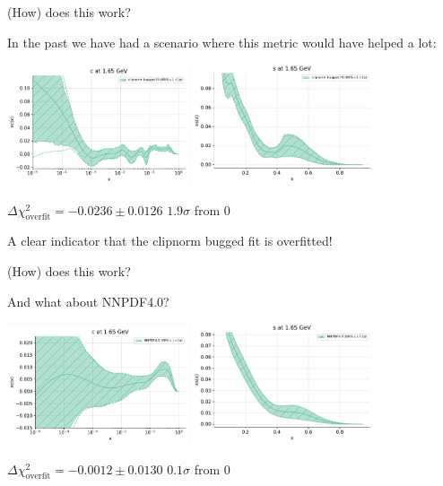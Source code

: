 \documentclass[aspectratio=169,11pt]{beamer}
\begin{document}
\begin{frame}[t]{(How) does this work?}

  In the past we have had a scenario where this metric would have helped a lot:

  \begin{center}
    \includegraphics[width=0.4\textwidth]{clipnorm_fit_charm_plot_pdfs_c.pdf}
    \includegraphics[width=0.4\textwidth]{clipnorm_fit_strange_plot_pdfs_s.pdf}
  \end{center}

  \begin{center}
    $\Delta\chi^2_{\text{overfit}}=-0.0236 \pm 0.0126$ \quad $1.9\sigma$ from 0
  \end{center}

  A clear indicator that the clipnorm bugged fit is overfitted!

\end{frame}


\begin{frame}[t]{(How) does this work?}

  And what about NNPDF4.0?

  \begin{center}
    \includegraphics[width=0.4\textwidth]{NNPDF40_fit_charm_plot_pdfs_c.pdf}
    \includegraphics[width=0.4\textwidth]{NNPDF40_fit_strange_plot_pdfs_s.pdf}
  \end{center}

  \begin{center}
    $\Delta\chi^2_{\text{overfit}}=-0.0012 \pm 0.0130$ \quad $0.1\sigma$ from 0
  \end{center}

\end{frame}
\end{document}
